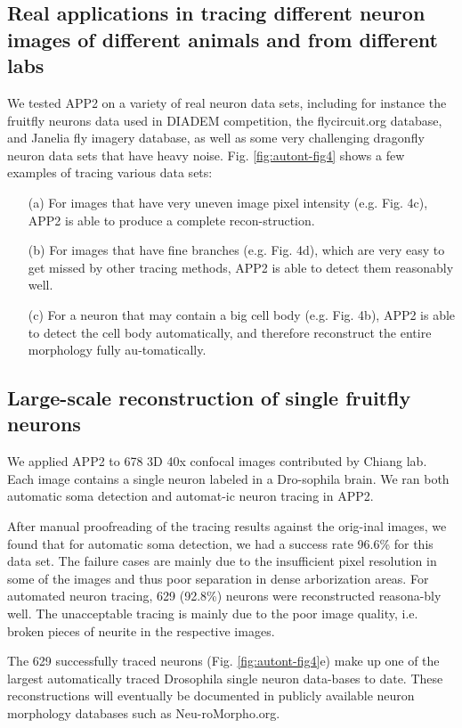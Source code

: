 \subsection{Real applications in tracing different neuron images of different animals and from different labs}
We tested APP2 on a variety of real neuron data sets, including for instance the fruitfly neurons data used in DIADEM competition, the flycircuit.org database, and Janelia fly imagery database, as well as some very challenging dragonfly neuron data sets \cite{gonzalez2013eight} that have heavy noise. 
Fig. \ref{fig:autont-fig4} shows a few examples of tracing various data sets:
\begin{itemize}
\item[(a)]	For images that have very uneven image pixel intensity (e.g. Fig. 4c), APP2 is able to produce a complete recon-struction. 
\item[(b)]	For images that have fine branches (e.g. Fig. 4d), which are very easy to get missed by other tracing methods, APP2 is able to detect them reasonably well. 
\item[(c)]	For a neuron that may contain a big cell body (e.g. Fig. 4b), APP2 is able to detect the cell body automatically, and therefore reconstruct the entire morphology fully au-tomatically.
\end{itemize}

\subsection{Large-scale reconstruction of single fruitfly neurons}
We applied APP2 to 678 3D 40x confocal images contributed by Chiang lab. Each image contains a single neuron labeled in a Dro-sophila brain. We ran both automatic soma detection and automat-ic neuron tracing in APP2. 

After manual proofreading of the tracing results against the orig-inal images, we found that for automatic soma detection, we had a success rate 96.6\% for this data set. The failure cases are mainly due to the insufficient pixel resolution in some of the images and thus poor separation in dense arborization areas. For automated neuron tracing, 629 (92.8\%) neurons were reconstructed reasona-bly well. The unacceptable tracing is mainly due to the poor image quality, i.e. broken pieces of neurite in the respective images. 

The 629 successfully traced neurons (Fig. \ref{fig:autont-fig4}e) make up one of the largest automatically traced Drosophila single neuron data-bases to date. These reconstructions will eventually be documented in publicly available neuron morphology databases such as Neu-roMorpho.org. 

